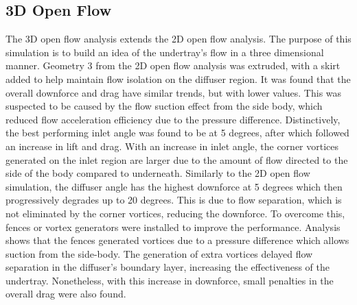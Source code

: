 \subsection{3D Open Flow}
The 3D open flow analysis extends the 2D open flow analysis. The purpose of this simulation is to build an idea of the undertray's flow in a three dimensional manner. Geometry 3 from the 2D open flow analysis was extruded, with a skirt added to help maintain flow isolation on the diffuser region. It was found that the overall downforce and drag have similar trends, but with lower values. This was suspected to be caused by the flow suction effect from the side body, which reduced flow acceleration efficiency due to the pressure difference. Distinctively, the best performing inlet angle was found to be at 5 degrees, after which followed an increase in lift and drag. With an increase in inlet angle, the corner vortices generated on the inlet region are larger due to the amount of flow directed to the side of the body compared to underneath. Similarly to the 2D open flow simulation, the diffuser angle has the highest downforce at 5 degrees which then progressively degrades up to 20 degrees. This is due to flow separation, which is not eliminated by the corner vortices, reducing the downforce. To overcome this, fences or vortex generators were installed to improve the performance. Analysis shows that the fences generated vortices due to a pressure difference which allows suction from the side-body. The generation of extra vortices delayed flow separation in the diffuser's boundary layer, increasing the effectiveness of the undertray. Nonetheless, with this increase in downforce, small penalties in the overall drag were also found.

